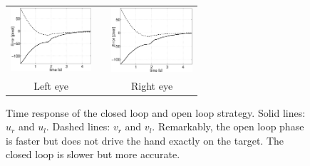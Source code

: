   \begin{figure}
  \begin{center}
	\begin{tabular}{ccc}
	  \parbox{30mm}{\includegraphics[width=30mm]{Figure/LeftEyeOpenClosedLoopTimeResponse.eps}}  & \hspace{.1cm} &
	  \parbox{30mm}{\includegraphics[width=30mm]{Figure/RightEyeOpenClosedLoopTimeResponse.eps}}
	  \\
	  \parbox{30mm}{\centering Left eye } & \hspace{.1cm} & \parbox{50mm}{\centering Right eye }
  \end{tabular}
\end{center}
\caption{Time response of the closed loop and open loop strategy. Solid lines: $u_r$ and $u_l$. Dashed lines: $v_r$ and $v_l$. Remarkably, the open loop phase is faster but does not drive the hand exactly on the target. The closed loop is slower but more accurate.}\label{Fig:TimeResponseOpenClosedLoop}
\end{figure}